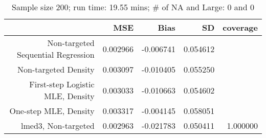 \begin{table}[ht]
\centering
\caption{Sample size 200; run time: 19.55 mins; # of NA and Large:  0 and 0} 
\begin{tabular}{rrrrr}
  \hline
 & MSE & Bias & SD & coverage \\ 
  \hline
Non-targeted Sequential Regression & 0.002966 & -0.006741 & 0.054612 &  \\ 
  Non-targeted Density & 0.003097 & -0.010405 & 0.055250 &  \\ 
  First-step Logistic MLE, Density & 0.003033 & -0.010663 & 0.054602 &  \\ 
  One-step MLE, Density & 0.003317 & -0.004145 & 0.058051 &  \\ 
  lmed3, Non-targeted & 0.002963 & -0.021783 & 0.050411 & 1.000000 \\ 
   \hline
\end{tabular}
\end{table}

